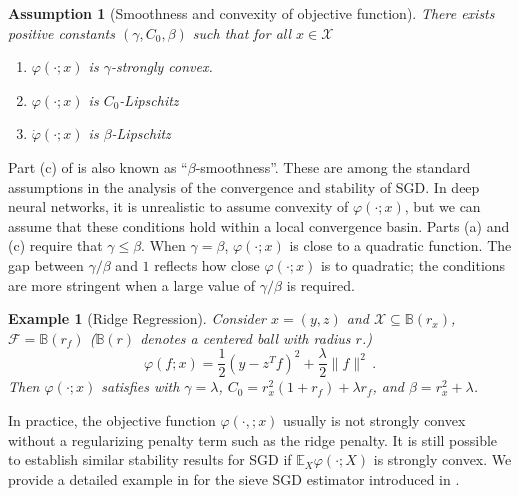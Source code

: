 \documentclass[11pt]{article}
\theoremstyle{plain}
\newtheorem{example}[theorem]{Example}
\newtheorem{assumption}[theorem]{Assumption}
\newcommand{\X}{{\mathcal{X}}}
\begin{document}
\begin{assumption}
    [Smoothness and convexity of objective function]\label{asm:6.1-smooth_convex}
    There exists positive constants $(\gamma, C_0, \beta)$ such that for all $x\in\X$
    \begin{enumerate}
        \item [(a)] $\varphi(\cdot;x)$ is $\gamma$-strongly convex.
        \item [(b)] $\varphi(\cdot;x)$ is $C_0$-Lipschitz
        \item [(c)] $\dot\varphi(\cdot;x)$ is $\beta$-Lipschitz        \end{enumerate}
\end{assumption}
Part (c) of  is also known as  ``$\beta$-smoothness''.  These are among the standard assumptions in the analysis of the convergence and stability of SGD.  In deep neural networks, it is unrealistic to assume convexity of $\varphi(\cdot;x)$, but we can assume that these conditions hold within a local convergence basin.  Parts (a) and (c) require that $\gamma\le \beta$. When $\gamma=\beta$, $\varphi(\cdot;x)$ is close to a quadratic function. The gap between $\gamma/\beta$ and $1$ reflects how close $\varphi(\cdot;x)$ is to quadratic; the conditions are more stringent when a large value of $\gamma/\beta$ is required.


\begin{example}[Ridge Regression]\label{exa:6.1-ridge} 
Consider $x=(y,z)$ and $\X\subseteq \mathbb B(r_x)$, $\mathcal F=\mathbb B(r_f)$ ($\mathbb B(r)$ denotes a centered ball with radius $r$.)
$$\varphi(f;x)=\frac{1}{2}(y-z^T f)^2+\frac{\lambda}{2}\|f\|^2\,.$$
Then $\varphi(\cdot;x)$ satisfies  with $\gamma=\lambda$, $C_0=r_x^2(1+r_f)+\lambda r_f$, and $\beta=r_x^2+\lambda$. \end{example}

In practice, the objective function $\varphi(\cdot,;x)$ usually is not strongly convex without a regularizing penalty term such as the ridge penalty.  It is still possible to establish similar stability results for SGD if $\mathbb E_X\varphi(\cdot;X)$ is strongly convex.  We provide a detailed example in  for the sieve SGD estimator introduced in .  
\end{document}
